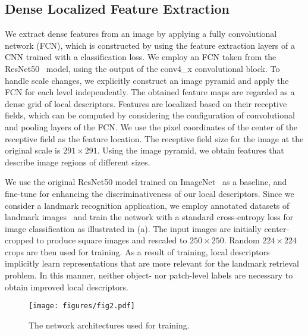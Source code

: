 \documentclass[10pt,twocolumn,letterpaper]{article}
\begin{document}
\subsection{Dense Localized Feature Extraction}
\label{sub:dense}
We extract dense features from an image by applying a fully convolutional network (FCN), which is constructed by using the feature extraction layers of a CNN trained with a classification loss.
We employ an FCN taken from the ResNet50~\cite{he2015deep} model, using the output of
the \textsf{conv4\_x} convolutional block.
To handle scale changes, we explicitly construct an image pyramid and apply the FCN for each level independently.
The obtained feature maps are regarded as a dense grid of local descriptors.
Features are localized based on their receptive fields, which can be computed by considering the configuration of convolutional and pooling layers of the FCN.
We use the pixel coordinates of the center of the receptive field as the feature location.
The receptive field size for the image at the original scale is $291\times 291$.
Using the image pyramid, we obtain features that describe image regions of different sizes.



We use the original ResNet50 model trained on ImageNet~\cite{russakovsky2015imagenet} as a baseline, and fine-tune for enhancing the discriminativeness of our local descriptors. 
Since we consider a landmark recognition application, we employ annotated datasets of landmark images~\cite{babenko2014neural} and train the network with a standard cross-entropy loss for image classification as illustrated in (a).
The input images are initially center-cropped to produce square images and rescaled
to $250\times 250$.
Random $224\times 224$ crops are then used for training.
As a result of training, local descriptors implicitly learn representations that are more relevant for the landmark retrieval problem.
In this manner, neither object- nor patch-level labels are necessary to obtain improved local descriptors.





\begin{figure}[t]
\begin{center}
   \texttt{[image: figures/fig2.pdf]}
\end{center}
	\vspace{-15pt}
\caption{The network architectures used for training.}
\label{fig:train_model}
\vspace{-5pt}                                                                                                                                                                                                           
\end{figure}
\end{document}
